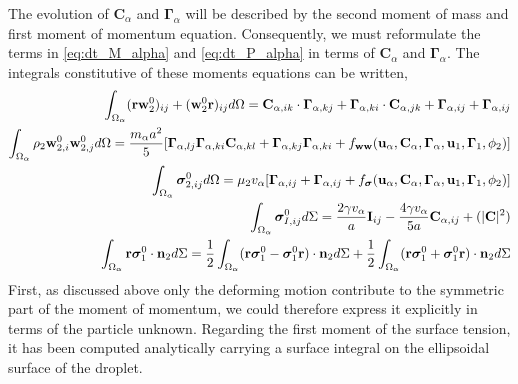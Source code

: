 The evolution of $\textbf{C}_\alpha$ and $\bm\Gamma_\alpha$ will be described by the second moment of mass and first moment of momentum equation.
Consequently, we must reformulate the terms in \ref{eq:dt_M_alpha} and \ref{eq:dt_P_alpha} in terms of $\textbf{C}_\alpha$ and $\bm\Gamma_\alpha$. 
The integrals constitutive of these moments equations can be written, 
\begin{align}
    \int_{\Omega_\alpha} (\textbf{rw}_2^0 )_{ij}+ (\textbf{w}_2^0 \textbf{r})_{ij} d\Omega 
    = \textbf{C}_{\alpha,ik} \cdot \bm\Gamma_{\alpha,kj}
    +  \bm\Gamma_{\alpha,ki} \cdot \textbf{C}_{\alpha,jk}
    +  \bm\Gamma_{\alpha,ij} + \bm\Gamma_{\alpha,ij}
    \\
    \int_{\Omega_\alpha} \rho_2 \textbf{w}_{2,i}^0\textbf{w}_{2,j}^0 d\Omega
    = \frac{m_\alpha a^2}{5}[
        \bm\Gamma_{\alpha,lj}\bm\Gamma_{\alpha,ki} \textbf{C}_{\alpha,kl} 
        + \bm\Gamma_{\alpha,kj}\bm\Gamma_{\alpha,ki} 
        + f_\textbf{ww}(\textbf{u}_\alpha,\textbf{C}_\alpha,\bm\Gamma_\alpha,\textbf{u}_1,\bm \Gamma_1,\phi_2)
        ]
    \\
    \label{eq:sigma_2_def}
    \int_{\Omega_\alpha} \bm\sigma_{2,ij}^0 d\Omega
    =
    \mu_2 v_\alpha [\bm\Gamma_{\alpha,ij} + \bm\Gamma_{\alpha,ij}
    + f_{\bm{\sigma}}(\textbf{u}_\alpha,\textbf{C}_\alpha,\bm\Gamma_\alpha,\textbf{u}_1,\bm \Gamma_1,\phi_2)]
    \\
    \label{eq:sigma_I_def}
    \int_{\Omega_\alpha} \bm\sigma_{I,ij}^0 d\Sigma
    = \frac{2 \gamma v_\alpha }{a} \textbf{I}_{ij} - \frac{4 \gamma v_\alpha }{5 a} \textbf{C}_{\alpha,ij}
    +\mathcal(|\textbf{C}|^2)\\
    \int_{\Omega_\alpha} \textbf{r}\bm\sigma_1^0\cdot \textbf{n}_2 d\Sigma
    = 
    \frac{1}{2}\int_{\Omega_\alpha} (\textbf{r}\bm\sigma_1^0-\bm\sigma_1^0\textbf{r})\cdot \textbf{n}_2 d\Sigma
    + \frac{1}{2}\int_{\Omega_\alpha} (\textbf{r}\bm\sigma_1^0+\bm\sigma_1^0\textbf{r})\cdot \textbf{n}_2 d\Sigma
\end{align}
First, as discussed above only the deforming motion contribute to the symmetric part of the moment of momentum, we could therefore express it explicitly in terms of the particle unknown. 
Regarding the first moment of the surface tension, it has been computed analytically carrying a surface integral on the ellipsoidal surface of the droplet. 
